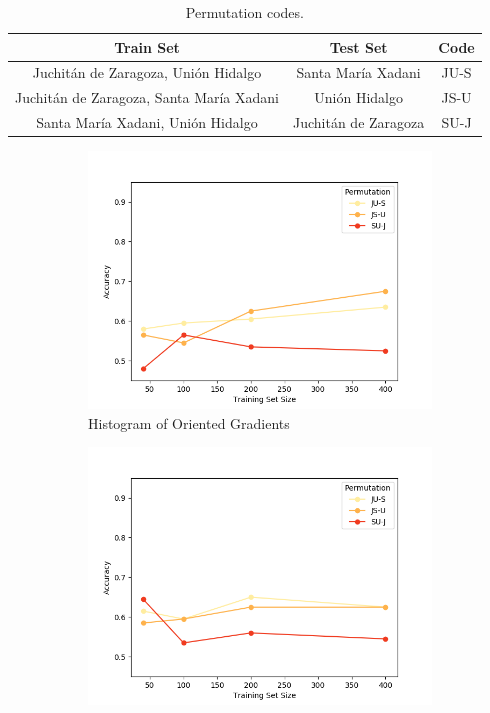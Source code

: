 \begin{table}
  \caption{Permutation codes.}
  \begin{tabular}{|c|c|c|}
    \hline
    Train Set                                      &Test Set               &Code \\ \hline
    Juchit\'an de Zaragoza, Uni\'on Hidalgo        &Santa Mar\'ia Xadani   &JU-S \\ \hline
    Juchit\'an de Zaragoza, Santa Mar\'ia Xadani   &Uni\'on Hidalgo        &JS-U \\ \hline
    Santa Mar\'ia Xadani, Uni\'on Hidalgo          &Juchit\'an de Zaragoza &SU-J \\ 
    \hline
  \end{tabular}
  \label{table:classic}
\end{table}

\begin{figure}[ht]
  \centering
    \begin{subfigure}{.49\textwidth}
        \includegraphics[width=\textwidth]{images/classic-hog.png}
        \caption{Histogram of Oriented Gradients}
    \end{subfigure}
    \begin{subfigure}{.49\textwidth}
        \includegraphics[width=\textwidth]{images/classic-means.png}

\end{subfigure}
\end{figure}
